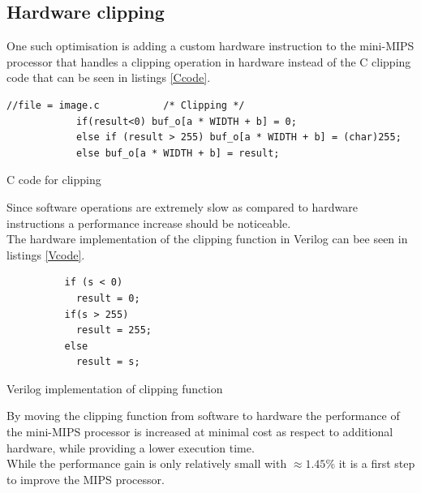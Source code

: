 \documentclass[10pt]{article}
\begin{document}
\subsection{Hardware clipping}
One such optimisation is adding a custom hardware instruction to the mini-MIPS processor that handles a clipping operation in hardware instead of the C clipping code that can be seen in listings \ref{Ccode}.\\
\begin{listing}[H]
\begin{verbatim}
//file = image.c           /* Clipping */
            if(result<0) buf_o[a * WIDTH + b] = 0;
            else if (result > 255) buf_o[a * WIDTH + b] = (char)255;
            else buf_o[a * WIDTH + b] = result;
\end{verbatim}
\caption{C code for clipping}
\label{Ccode}
\end{listing}
Since software operations are extremely slow as compared to hardware instructions a performance increase should be noticeable.\\
The hardware implementation of the clipping function in Verilog can bee seen in listings \ref{Vcode}. %
\begin{listing}[H]
\begin{verbatim}
          if (s < 0)
            result = 0;
          if(s > 255)
            result = 255;
          else
            result = s;
\end{verbatim}
\caption{Verilog implementation of clipping function}
\label{Vcode}
\end{listing}
By moving the clipping function from software to hardware the performance of the mini-MIPS processor is increased at minimal cost as respect to additional hardware, while providing a lower execution time. \\
While the performance gain is only relatively small with $ \approx 1.45\%$ it is a first step to improve the MIPS processor.

\end{document}
